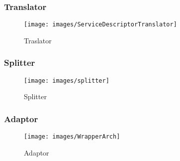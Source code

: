 \begin{frame}
\frametitle{Translator}

\begin{figure}
	\centering
	\texttt{[image: images/ServiceDescriptorTranslator]}
	\caption{Traslator}
	\label{fig:servicedescriptortranslator}
\end{figure}

\end{frame}
%
%
\begin{frame}
\frametitle{Splitter}
\begin{figure}
	\centering
	\texttt{[image: images/splitter]}
	\caption{Splitter}
	\label{fig:splitter}
\end{figure}

\end{frame}

\begin{frame}
\frametitle{Adaptor}
\begin{figure}
	\centering
	\texttt{[image: images/WrapperArch]}
	\caption{Adaptor}
	\label{fig:wrapperarch}
\end{figure}




\end{frame}

